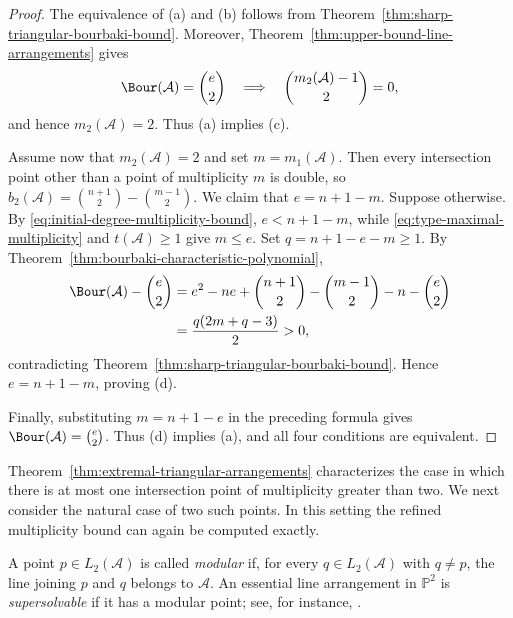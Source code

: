 \documentclass[11pt]{amsart}   %
\theoremstyle{definition}
\def\NZQ{\mathbb}               %
\def\PP{{\NZQ P}}
\def\A{{\mathcal A}}
\begin{document}
\begin{proof}
The equivalence of (a) and (b) follows from Theorem~\ref{thm:sharp-triangular-bourbaki-bound}. Moreover, Theorem~\ref{thm:upper-bound-line-arrangements} gives
\[
\Bour(\A)=\binom e2
\quad\Longrightarrow\quad
\binom{m_2(\A)-1}{2}=0,
\]
and hence $m_2(\A)=2$. Thus (a) implies (c).

Assume now that $m_2(\A)=2$ and set $m=m_1(\A)$. Then every intersection point other than a point of multiplicity $m$ is double, so $b_2(\A) =\binom{n+1}{2}-\binom{m-1}{2}.$ We claim that $e=n+1-m$. Suppose otherwise. By \eqref{eq:initial-degree-multiplicity-bound}, $e<n+1-m$, while \eqref{eq:type-maximal-multiplicity} and $t(\A)\geq1$ give $m\leq e$. Set $q=n+1-e-m\geq1$. By Theorem~\ref{thm:bourbaki-characteristic-polynomial},
\[
\begin{aligned}
\Bour(\A)-\binom e2
&= e^2-ne+\binom{n+1}{2} -\binom{m-1}{2}-n-\binom e2\\ &=
\frac{q(2m+q-3)}{2}>0,
\end{aligned}
\]
contradicting Theorem~\ref{thm:sharp-triangular-bourbaki-bound}. Hence $e=n+1-m$, proving (d).

Finally, substituting $m=n+1-e$ in the preceding formula gives $\Bour(\A)=\binom e2$. Thus (d) implies (a), and all four conditions are equivalent.
\end{proof}

Theorem~\ref{thm:extremal-triangular-arrangements} characterizes the case in which there is at most one intersection point of multiplicity greater than two. We next consider the natural case of two such points. In this setting the refined multiplicity bound can again be computed exactly.

A point $p\in L_2(\A)$ is called \emph{modular} if, for every $q\in L_2(\A)$ with $q\neq p$, the line joining $p$ and $q$ belongs to $\A$. An essential line arrangement in $\PP^2$ is \emph{supersolvable} if it has a modular point; see, for instance, \cite{Dimca-Sticlaru-supersolvable}.
\end{document}
